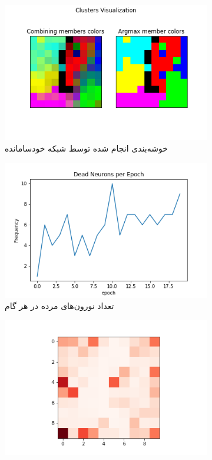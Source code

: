 \documentclass[12pt, a4paper]{article}
\begin{document}
\clearpage

\begin{figure}[h]
    \begin{subfigure}{\linewidth}
        \centering
        \includegraphics[width=0.8\linewidth]{images/q5/r12/cluster.png}
        \caption{خوشه‌بندی انجام شده توسط شبکه خودسامانده}
    \end{subfigure}
    \newline
    \begin{subfigure}{0.45\linewidth}
        \includegraphics[width=\linewidth]{images/q5/r12/dead.png}
        \caption{تعداد نورون‌های مرده در هر گام}
    \end{subfigure}
    \hfill
    \begin{subfigure}{0.45\linewidth}
        \includegraphics[width=\linewidth]{images/q5/r12/umatrix.png}

\end{subfigure}
\end{figure}
\end{document}
